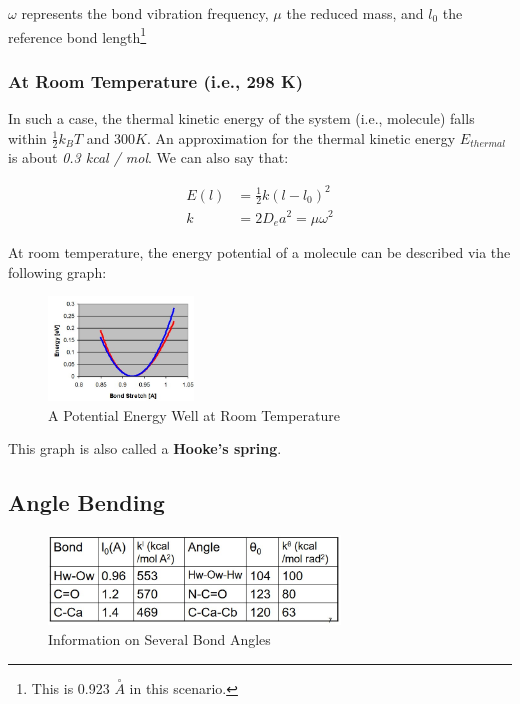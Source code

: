\documentclass[
  letterpaper,
  DIV=11,
  numbers=noendperiod]{scrreprt}
\begin{document}
\(\omega\) represents the bond vibration frequency, \(\mu\) the reduced
mass, and \(l_0\) the reference bond length\footnote{This is 0.923
  \(\stackrel{\circ}{A}\) in this scenario.}

\hypertarget{at-room-temperature-i.e.-298-k}{%
\subsubsection{At Room Temperature (i.e., 298
K)}\label{at-room-temperature-i.e.-298-k}}

In such a case, the thermal kinetic energy of the system (i.e.,
molecule) falls within \(\displaystyle \frac{1}{2}k_BT\) and \(300 K\).
An approximation for the thermal kinetic energy \(E_{thermal}\) is about
\emph{0.3 kcal / mol}. We can also say that:

\begin{align}
  E(l) &= \frac{1}{2}k(l - l_0)^2 \\ 
  k &= 2D_ea^2 = \mu\omega^2
\end{align}

At room temperature, the energy potential of a molecule can be described
via the following graph:

\begin{figure}

{\centering \includegraphics[width=1.52in,height=\textheight]{./images/wk2/well.jpg}

}

\caption{A Potential Energy Well at Room Temperature}

\end{figure}

This graph is also called a \textbf{Hooke's spring}.

\hypertarget{angle-bending}{%
\subsection{Angle Bending}\label{angle-bending}}

\begin{figure}

{\centering \includegraphics[width=3.05in,height=\textheight]{./images/wk2/bondangle.jpg}

}

\caption{Information on Several Bond Angles}

\end{figure}
\end{document}
